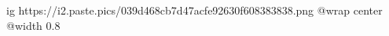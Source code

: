  
 
 
 
 

\ifcmt
  ig https://i2.paste.pics/039d468cb7d47acfe92630f608383838.png
  @wrap center
  @width 0.8
\fi
